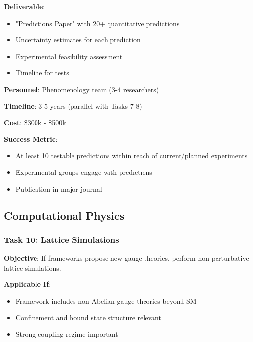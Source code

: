 \textbf{Deliverable}:
\begin{itemize}
    \item "Predictions Paper" with 20+ quantitative predictions
    \item Uncertainty estimates for each prediction
    \item Experimental feasibility assessment
    \item Timeline for tests
\end{itemize}

\textbf{Personnel}: Phenomenology team (3-4 researchers)

\textbf{Timeline}: 3-5 years (parallel with Tasks 7-8)

\textbf{Cost}: \$300k - \$500k

\textbf{Success Metric}:
\begin{itemize}
    \item At least 10 testable predictions within reach of current/planned experiments
    \item Experimental groups engage with predictions
    \item Publication in major journal
\end{itemize}

\subsection{Computational Physics}

\subsubsection{Task 10: Lattice Simulations}

\textbf{Objective}: If frameworks propose new gauge theories, perform non-perturbative lattice simulations.

\textbf{Applicable If}:
\begin{itemize}
    \item Framework includes non-Abelian gauge theories beyond SM
    \item Confinement and bound state structure relevant
    \item Strong coupling regime important
\end{itemize}

